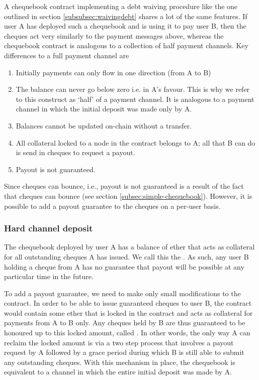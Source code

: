 A chequebook contract implementing a debt waiving procedure like the one outlined in section \ref{subsubsec:waivingdebt} shares a lot of the same features. If user A has deployed such a chequebook and is using it to pay user B, then the cheques act very similarly to the payment messages above, whereas the chequebook contract is analogous to a collection of half payment channels. Key differences to a full payment channel are 

\begin{enumerate}
    \item Initially payments can only flow in one direction (from A to B) 
    \item The balance can never go below zero i.e. in A's favour. This is why we refer to this construct as `half' of a payment channel. It is analogous to a payment channel in which the initial deposit was made only by A.
    \item Balances cannot be updated on-chain without a transfer. 
    \item All collateral locked to a node in the contract belongs to A; all that B can do is send in cheques to request a payout.%
    \item Payout is not guaranteed. 
\end{enumerate}

Since cheques can bounce, i.e., payout is not guaranteed is a result of the fact that cheques can bounce (see section \ref{subsec:simple-chequebook}). However, it is possible to add a payout guarantee to the cheques on a per-user basis.

\subsubsection{Hard channel deposit}\label{subsubsec:per-user-guarantees}

The chequebook deployed by user A has a balance of ether that acts as collateral for all outstanding cheques A has issued. We call this the . As such, any user B holding a cheque from A has no guarantee that payout will be possible at any particular time in the future. 

To add a payout guarantee, we need to make only small modifications to the contract. In order to be able to issue guaranteed cheques to user B, the contract would contain some ether that is locked in the contract and acts as collateral for payments from A to B only. Any cheques held by B are thus guaranteed to be honoured up to this locked amount, called . In other words, the only way A can reclaim the locked amount is via a two step process that involves a payout request by A followed by a grace period during which B is still able to submit any outstanding cheques. With this mechanism in place, the chequebook is equivalent to a channel in which the entire initial deposit was made by A. 

